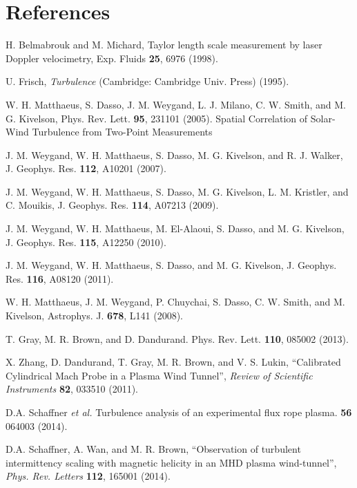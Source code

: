 \documentclass[aps,prl,amsmath,amssymb,reprint,superscriptaddress]{revtex4-1} %
\begin{document}
\section*{References}
\begin{thebibliography}{99}

H. Belmabrouk  and M. Michard, Taylor length scale measurement by laser Doppler velocimetry, Exp. Fluids {\bf 25}, 6976 (1998).

 U. Frisch, {\it Turbulence} (Cambridge: Cambridge Univ. Press) (1995).

W. H. Matthaeus, S. Dasso, J. M. Weygand, L. J. Milano, C. W. Smith, and M. G. Kivelson, Phys. Rev. Lett. {\bf 95}, 231101 (2005). Spatial Correlation of Solar-Wind Turbulence from Two-Point Measurements

J. M. Weygand, W. H. Matthaeus, S. Dasso, M. G. Kivelson, 
and R. J. Walker, J. Geophys. Res. {\bf 112}, A10201 (2007).

J. M. Weygand, W. H. Matthaeus, S. Dasso, M. G. Kivelson, 
L. M. Kristler, and C. Mouikis, J. Geophys. Res. {\bf 114},
A07213 (2009).

J. M. Weygand, W. H. Matthaeus, M. El-Alaoui, S. Dasso, and
M. G. Kivelson, J. Geophys. Res. {\bf 115}, A12250 (2010).

J. M. Weygand, W. H. Matthaeus, S. Dasso, and M. G. Kivelson, J. Geophys. Res. {\bf 116}, A08120 (2011).

W. H. Matthaeus, J. M. Weygand, P. Chuychai, S. Dasso, 
C. W. Smith, and M. Kivelson, Astrophys. J. {\bf 678},
L141 (2008).

 T. Gray, M. R. Brown, and D. Dandurand. Phys. Rev. Lett. {\bf 110}, 085002 (2013). 

X. Zhang, D. Dandurand, T. Gray, M. R. Brown, and V. S. Lukin, ``Calibrated Cylindrical Mach Probe in a Plasma Wind Tunnel'', {\it Review of Scientific Instruments} {\bf 82}, 033510 (2011).

 D.A. Schaffner {\it et al.} Turbulence analysis of an experimental flux rope plasma. {\bf 56} 064003 (2014).

D.A. Schaffner, A. Wan, and M. R. Brown, ``Observation of turbulent intermittency scaling with magnetic helicity in an MHD plasma wind-tunnel'', {\it Phys. Rev. Letters} {\bf 112}, 165001 (2014).


\end{thebibliography}
\end{document}
